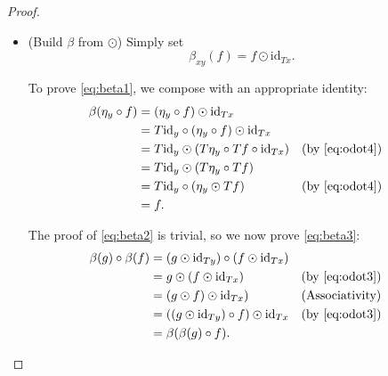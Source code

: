 \documentclass[11pt]{article}
\theoremstyle{nonumberplain}
\newtheorem{proof}{Proof}
\newcommand{\id}{\mathrm{id}}
\begin{document}
\begin{proof}
\begin{itemize}
Finally, we prove \eqref{eq:odot4}.
\begin{equation}
\begin{aligned}
Th \circ (g \odot f) &= Th \circ \mu_z \circ Tg \circ f \\
&= \mu_w \circ T^2 h \circ Tg \circ f && \text{(Naturality)}\\
&= Th \odot (Tg \circ f).
\end{aligned}
\end{equation}

The first part of the proof is complete. The rest of the proof is mostly similar algebraic manipulations, so we omit them when they are simple.

\item (Build $\beta$ from $\odot$) Simply set
\begin{equation}
\beta_{xy}(f) = f \odot \id_{Tx}.
\end{equation}

To prove \eqref{eq:beta1}, we compose with an appropriate identity:
\begin{equation}
\begin{aligned}
\beta(\eta_y \circ f) &= (\eta_y \circ f) \odot \id_{Tx} \\
&= T \id_y \circ (\eta_y \circ f) \odot \id_{Tx}\\
&= T \id_y \odot (T\eta_y \circ Tf \circ \id_{Tx})&&\text{(by \eqref{eq:odot4})}\\
&= T \id_y \odot (T\eta_y \circ Tf)\\
&= T \id_y \circ (\eta_y \odot Tf)&&\text{(by \eqref{eq:odot4})}\\
&= f.
\end{aligned}
\end{equation}

The proof of \eqref{eq:beta2} is trivial, so we now prove \eqref{eq:beta3}:
\begin{equation}
\begin{aligned}
\beta(g) \circ \beta(f) &= (g \odot \id_{Ty}) \circ (f \odot \id_{Tx})\\
&= g \odot (f \odot \id_{Tx}) && \text{(by \eqref{eq:odot3})}\\
&= (g \odot f) \odot \id_{Tx}) && \text{(Associativity)}\\
&= ((g \odot \id_{Ty}) \circ f) \odot \id_{Tx} && \text{(by \eqref{eq:odot3})}\\
&= \beta(\beta(g) \circ f).
\end{aligned}
\end{equation}


\end{itemize}
\end{proof}
\end{document}
